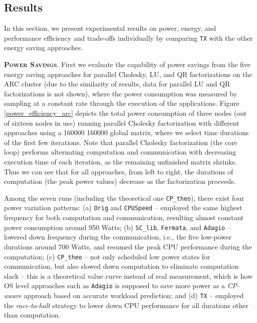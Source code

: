 \documentclass[12pt]{elsarticle}
\begin{document}
\subsection{Results}

In this section, we present experimental results on power, energy, and performance efficiency and trade-offs individually by comparing \texttt{TX} with the other energy saving approaches.

\vspace{1mm}
\noindent\textsc{\textbf{Power Savings}}. First we evaluate the capability of power savings from the five energy saving approaches for parallel Cholesky, LU, and QR factorizations on the ARC cluster (due to the similarity of results, data for parallel LU and QR factorizations is not shown), where the power consumption was measured by sampling at a constant rate through the execution of the applications. Figure \ref{power_efficiency_arc} depicts the total power consumption of three nodes (out of sixteen nodes in use) running parallel Cholesky factorization with different approaches using a 160000  160000 global matrix, where we select time durations of the first few iterations. Note that parallel Cholesky factorization (the core loop) performs alternating computation and communication with decreasing execution time of each iteration, as the remaining unfinished matrix shrinks. Thus we can see that for all approaches, from left to right, the durations of computation (the peak power values) decrease as the factorization proceeds.

Among the seven runs (including the theoretical one \texttt{CP\_theo}), there exist four power variation patterns: (a) \texttt{Orig} and \texttt{CPUSpeed} -- employed the same highest frequency for both computation and communication, resulting almost constant power consumption around 950 Watts; (b) \texttt{SC\_lib}, \texttt{Fermata}, and \texttt{Adagio} -- lowered down frequency during the communication, i.e., the five low-power durations around 700 Watts, and resumed the peak CPU performance during the computation; (c) \texttt{CP\_theo} -- not only scheduled low power states for communication, but also slowed down computation to eliminate computation slack -- this is a theoretical value curve instead of real measurement, which is how OS level approaches such as \texttt{Adagio} is supposed to save more power as a \emph{CP-aware} approach based on accurate workload prediction; and (d) \texttt{TX} -- employed the \emph{race-to-halt} strategy to lower down CPU performance for all durations other than computation.
\end{document}

